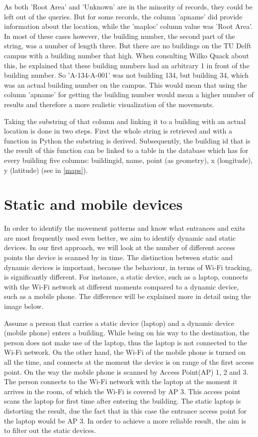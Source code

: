 As both 'Root Area' and 'Unknown' are in the minority of records, they could be left out of the queries. But for some records, the column 'apname' did provide information about the location, while the 'maploc' column value was 'Root Area'. In most of these cases however, the building number, the second part of the string, was a number of length three. But there are no buildings on the TU Delft campus with a building number that high. When consulting Wilko Quack about this, he explained that these building numbers had an arbitrary 1 in front of the building number. So 'A-134-A-001' was not building 134, but building 34, which was an actual building number on the campus. This would mean that using the column 'apname' for getting the building number would mean a higher number of results and therefore a more realistic visualization of the movements. 

Taking the substring of that column and linking it to a building with an actual location is done in two steps. First the whole string is retrieved and with a function in Python the substring is derived. Subsequently, the building id that is the result of this function can be linked to a table in the database which has for every building five columns: buildingid, name, point (as geometry), x (longitude), y (latitude) (see in \autoref{maps}).

\section{Static and mobile devices}\label{Static and mobile devices}

In order to identify the movement patterns and know what entrances and exits are most frequently used even better, we aim to identify dynamic and static devices. In our first approach, we will look at the number of different access points the device is scanned by in time. The distinction between static and dynamic devices is important, because the behaviour, in terms of Wi-Fi tracking, is significantly different. For instance, a static device, such as a laptop, connects with the Wi-Fi network at different moments compared to a dynamic device, such as a mobile phone. The difference will be explained more in detail using the image below. 

Assume a person that carries a static device (laptop) and a dynamic device (mobile phone) enters a building. While being on his way to the destination, the person does not make use of the laptop, thus the laptop is not connected to the Wi-Fi network. On the other hand, the Wi-Fi of the mobile phone is turned on all the time, and connects at the moment the device is on range of the first access point. On the way the mobile phone is scanned by Access Point(AP) 1, 2 and 3. The person connects to the Wi-Fi network with the laptop at the moment it arrives in the room, of which the Wi-Fi is covered by AP 3. This access point scans the laptop for first time after entering the building. The static laptop is distorting the result, due the fact that in this case the entrance access point for the laptop would be AP 3. In order to achieve a more reliable result, the aim is to filter out the static devices.

